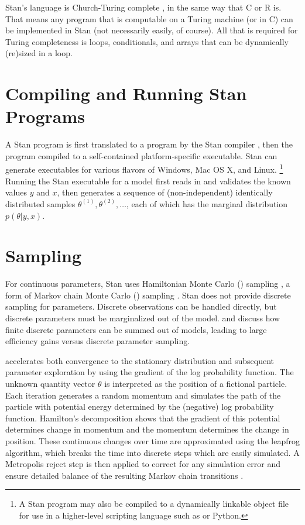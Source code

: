 Stan's language is Church-Turing complete
\cite{Church:1936,Turing:1936,HopcroftMotwani:2006}, in the same way
that C or R is.  That means any program that is computable on a Turing
machine (or in C) can be implemented in Stan (not necessarily easily,
of course).  All that is required for Turing completeness is loops,
conditionals, and arrays that can be dynamically (re)sized in a loop.

\section{Compiling and Running Stan Programs}

A Stan program is first translated to a \Cpp program by the Stan
compiler \stanc, then the \Cpp program compiled to a self-contained
platform-specific executable.  Stan can generate executables for
various flavors of Windows, Mac OS X, and Linux.%
%
\footnote{A Stan program may also be compiled to a dynamically
  linkable object file for use in a higher-level scripting language
  such as \R or Python.}
%
Running the Stan executable for a model first reads in and validates
the known values $y$ and $x$, then generates a sequence of
(non-independent) identically distributed samples $\theta^{(1)},
\theta^{(2)}, \ldots$, each of which has the marginal distribution
$p(\theta|y,x)$.


\section{Sampling}

For continuous parameters, Stan uses Hamiltonian Monte Carlo (\HMC)
sampling \citep{Duane:1987, Neal:1994, Neal:2011}, a form of Markov
chain Monte Carlo (\MCMC) sampling \citep{Metropolis:1953}.  Stan does
not provide discrete sampling for parameters. Discrete observations
can be handled directly, but discrete parameters must be marginalized
out of the model.   and
 discuss how finite discrete parameters
can be summed out of models, leading to large efficiency gains versus
discrete parameter sampling.

\HMC accelerates both convergence to the stationary distribution and
subsequent parameter exploration by using the gradient of the log
probability function.  The unknown quantity vector $\theta$ is
interpreted as the position of a fictional particle.  Each iteration
generates a random momentum and simulates the path of the particle
with potential energy determined by the (negative) log probability
function.  Hamilton's decomposition shows that the gradient of this
potential determines change in momentum and the momentum determines
the change in position.  These continuous changes over time are
approximated using the leapfrog algorithm, which breaks the time into
discrete steps which are easily simulated.  A Metropolis reject step
is then applied to correct for any simulation error and ensure
detailed balance of the resulting Markov chain transitions
\citep{Metropolis:1953, Hastings:1970}.

